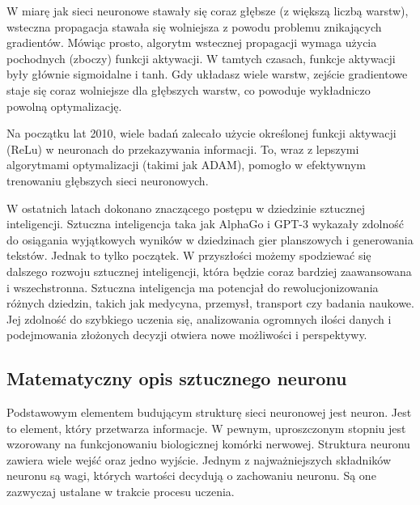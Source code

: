 \documentclass{article}
\begin{document}
W miarę jak sieci neuronowe stawały się coraz głębsze (z większą liczbą warstw), wsteczna propagacja stawała się wolniejsza z powodu problemu znikających gradientów.
Mówiąc prosto, algorytm wstecznej propagacji wymaga użycia pochodnych (zboczy) funkcji aktywacji.
W tamtych czasach, funkcje aktywacji były głównie sigmoidalne i tanh.
Gdy układasz wiele warstw, zejście gradientowe staje się coraz wolniejsze dla głębszych warstw, co powoduje wykładniczo powolną optymalizację.

Na początku lat 2010, wiele badań zalecało użycie określonej funkcji aktywacji (ReLu) w neuronach do przekazywania informacji. To, wraz z lepszymi algorytmami optymalizacji (takimi jak ADAM), pomogło w efektywnym trenowaniu głębszych sieci neuronowych.


W ostatnich latach dokonano znaczącego postępu w dziedzinie sztucznej inteligencji.
Sztuczna inteligencja taka jak AlphaGo i GPT-3 wykazały zdolność do osiągania wyjątkowych wyników w dziedzinach gier planszowych i generowania tekstów. Jednak to tylko początek. W przyszłości możemy spodziewać się dalszego rozwoju sztucznej inteligencji, która będzie coraz bardziej zaawansowana i wszechstronna.
Sztuczna inteligencja ma potencjał do rewolucjonizowania różnych dziedzin, takich jak medycyna, przemysł, transport czy badania naukowe.
Jej zdolność do szybkiego uczenia się, analizowania ogromnych ilości danych i podejmowania złożonych decyzji otwiera nowe możliwości i perspektywy.
\subsection{Matematyczny opis sztucznego neuronu}
Podstawowym elementem budującym strukturę sieci neuronowej jest neuron. Jest to element, który przetwarza informacje.
W pewnym, uproszczonym stopniu jest wzorowany na funkcjonowaniu biologicznej komórki nerwowej.
Struktura neuronu zawiera wiele wejść oraz jedno wyjście.
Jednym z najważniejszych składników neuronu są wagi, których wartości decydują o zachowaniu neuronu. Są one zazwyczaj ustalane w trakcie procesu uczenia.
\end{document}
